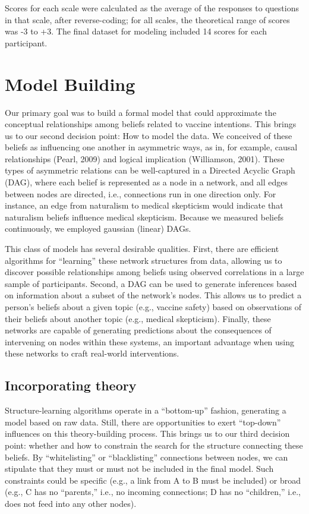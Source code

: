 \documentclass[10pt, letterpaper]{article}
\begin{document}
Scores for each scale were calculated as the average of the responses to
questions in that scale, after reverse-coding; for all scales, the
theoretical range of scores was -3 to +3. The final dataset for modeling
included 14 scores for each participant.

\section{Model Building}\label{model-building}

Our primary goal was to build a formal model that could approximate the
conceptual relationships among beliefs related to vaccine intentions.
This brings us to our second decision point: How to model the data. We
conceived of these beliefs as influencing one another in asymmetric
ways, as in, for example, causal relationships (Pearl, 2009) and logical
implication (Williamson, 2001). These types of asymmetric relations can
be well-captured in a Directed Acyclic Graph (DAG), where each belief is
represented as a node in a network, and all edges between nodes are
directed, i.e., connections run in one direction only. For instance, an
edge from naturalism to medical skepticism would indicate that
naturalism beliefs influence medical skepticism. Because we measured
beliefs continuously, we employed gaussian (linear) DAGs.

This class of models has several desirable qualities. First, there are
efficient algorithms for ``learning'' these network structures from
data, allowing us to discover possible relationships among beliefs using
observed correlations in a large sample of participants. Second, a DAG
can be used to generate inferences based on information about a subset
of the network's nodes. This allows us to predict a person's beliefs
about a given topic (e.g., vaccine safety) based on observations of
their beliefs about another topic (e.g., medical skepticism). Finally,
these networks are capable of generating predictions about the
consequences of intervening on nodes within these systems, an important
advantage when using these networks to craft real-world interventions.

\subsection{Incorporating theory}\label{incorporating-theory}

Structure-learning algorithms operate in a ``bottom-up'' fashion,
generating a model based on raw data. Still, there are opportunities to
exert ``top-down'' influences on this theory-building process. This
brings us to our third decision point: whether and how to constrain the
search for the structure connecting these beliefs. By ``whitelisting''
or ``blacklisting'' connections between nodes, we can stipulate that
they must or must not be included in the final model. Such constraints
could be specific (e.g., a link from A to B must be included) or broad
(e.g., C has no ``parents,'' i.e., no incoming connections; D has no
``children,'' i.e., does not feed into any other nodes).
\end{document}
